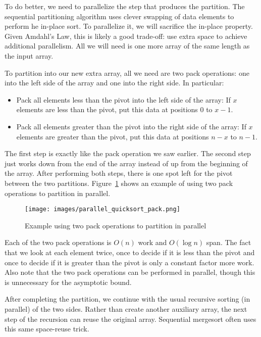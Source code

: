 \documentclass[10pt]{article}
\begin{document}
To do better, we need to parallelize the step that produces the
partition.  The sequential partitioning algorithm uses clever swapping
of data elements to perform he in-place sort.  To parallelize it, we
will sacrifice the in-place property.  Given Amdahl's Law, this is
likely a good trade-off: use extra space to achieve additional
parallelism.  All we will need is one more array of the same length as
the input array.

To partition into our new extra array, all we need are two pack
operations: one into the left side of the array and one into the right
side.  In particular:
\begin{itemize}
\item Pack all elements less than the pivot into the left side of the
  array: If $x$ elements are less than the pivot, put this data at
  positions $0$ to $x-1$.
\item Pack all elements greater than the pivot into the right side of the
  array: If $x$ elements are greater than the pivot, put this data at
  positions $n-x$ to $n-1$.
\end{itemize}
The first step is exactly like the pack operation we saw earlier.  The
second step just works down from the end of the array instead of up
from the beginning of the array.  After performing both steps, there
is one spot left for the pivot between the two partitions.  
Figure~\ref{fig:parallel_quicksort_pack} shows an example of using two
pack operations to partition in parallel.

\begin{figure}
\begin{center}
\texttt{[image: images/parallel\_quicksort\_pack.png]}
\end{center}
\caption{Example using two pack operations to partition in parallel}
\label{fig:parallel_quicksort_pack}
\end{figure}

Each of the two pack operations is $O(n)$ work and $O(\log n)$ span.
The fact that we look at each element twice, once to decide if it is
less than the pivot and once to decide if it is greater than the pivot
is only a constant factor more work.  Also note that the two
pack operations can be performed in parallel, though this is
unnecessary for the asymptotic bound.

After completing the partition, we continue with the usual recursive
sorting (in parallel) of the two sides.  Rather than create another
auxiliary array, the next step of the recursion can reuse the
original array.  Sequential mergesort often uses this same space-reuse
trick.
\end{document}

